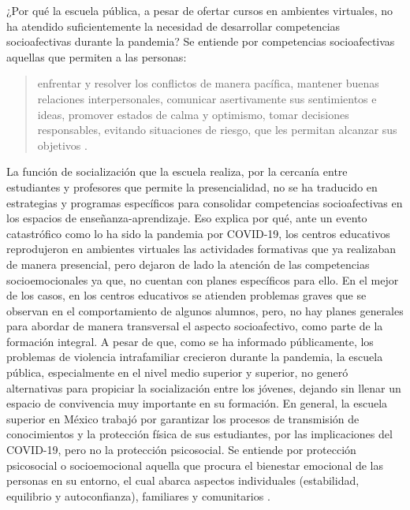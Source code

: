 \documentclass{textolivre}
\begin{document}
¿Por qué la escuela pública, a pesar de ofertar cursos en ambientes virtuales, no ha atendido suficientemente la necesidad de desarrollar competencias socioafectivas durante la pandemia? Se entiende por competencias socioafectivas aquellas que permiten a las personas: 

\begin{quote}
enfrentar y resolver los conflictos de manera pacífica, mantener buenas relaciones interpersonales, comunicar asertivamente sus sentimientos e ideas, promover estados de calma y optimismo, tomar decisiones responsables, evitando situaciones de riesgo, que les permitan alcanzar sus objetivos \cite[p. 1]{romagnoli2007}. 
\end{quote}

La función de socialización que la escuela realiza, por la cercanía entre estudiantes y profesores que permite la presencialidad, no se ha traducido en estrategias y programas específicos para consolidar competencias socioafectivas en los espacios de enseñanza-aprendizaje. Eso explica por qué, ante un evento catastrófico como lo ha sido la pandemia por COVID-19, los centros educativos reprodujeron en ambientes virtuales las actividades formativas que ya realizaban de manera presencial, pero dejaron de lado la atención de las competencias socioemocionales ya que, no cuentan con planes específicos para ello. En el mejor de los casos, en los centros educativos se atienden problemas graves que se observan en el comportamiento de algunos alumnos, pero, no hay planes generales para abordar de manera transversal el aspecto socioafectivo, como parte de la formación integral.  A pesar de que, como se ha informado públicamente, los problemas de violencia intrafamiliar crecieron durante la pandemia, la escuela pública, especialmente en el nivel medio superior y superior, no generó alternativas para propiciar la socialización entre los jóvenes, dejando sin llenar un espacio de convivencia muy importante en su formación. En general, la escuela superior en México trabajó por garantizar los procesos de transmisión de conocimientos y la protección física de sus estudiantes, por las implicaciones del COVID-19, pero no la protección psicosocial. Se entiende por protección psicosocial o socioemocional aquella que procura el bienestar emocional de las personas en su entorno, el cual abarca aspectos individuales (estabilidad, equilibrio y autoconfianza), familiares y comunitarios \cite{lopez2021}.
\end{document}
